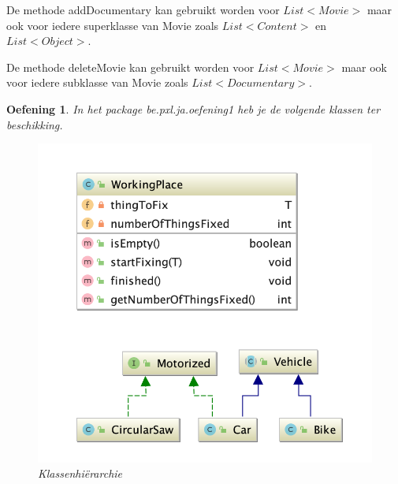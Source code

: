 \documentclass{tstextbook}
\newtheorem{envoefening}{Oefening}[chapter]
\newenvironment{oefening}
               {\begin{boxexercise}\begin{envoefening}}
               {\end{envoefening}\end{boxexercise}}
\begin{document}
De methode addDocumentary kan gebruikt worden voor $List<Movie>$ maar ook voor iedere superklasse van Movie zoals $List<Content>$ en $List<Object>$.

De methode deleteMovie kan gebruikt worden voor $List<Movie>$ maar ook voor iedere subklasse van Movie zoals $List<Documentary>$.

\begin{oefening}
In het package be.pxl.ja.oefening1 heb je de volgende klassen ter beschikking.

\begin{figure}[H]
\includegraphics{images/h4/bounds_exercise_diagram.png}
\caption{Klassenhi\"erarchie}
\label{fig:bounds_exercise}
\end{figure}


\end{oefening}
\end{document}
